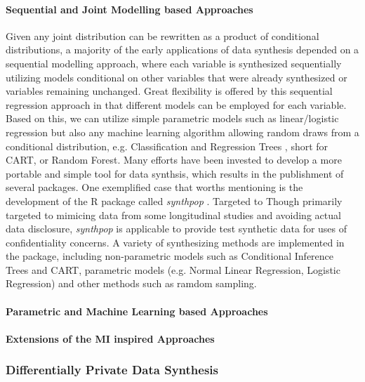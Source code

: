 \paragraph{Sequential and Joint Modelling based Approaches}
Given any joint distribution can be rewritten as a product of conditional distributions, a majority of the early applications of data synthesis depended on a sequential modelling approach, where each 
variable is synthesized sequentially utilizing models conditional on other variables that were already synthesized or variables remaining 
unchanged. Great flexibility is offered by this sequential regression approach in that different models can be employed for each variable.
Based on this, we can utilize simple parametric models such as linear/logistic regression but also any machine learning algorithm allowing random
draws from a conditional distribution, e.g. Classification and Regression Trees \citep{loh2011classification}, short for CART, or Random Forest. Many efforts have been invested to develop a more portable and simple tool for
data synthsis, which results in the publishment of several packages. One exemplified case that worths mentioning is the development of the R package called \textit{synthpop} \citep{nowok2016synthpop}. Targeted to 
Though primarily targeted to mimicing data from some longitudinal studies and avoiding actual data disclosure, \textit{synthpop} is applicable to provide test synthetic data
for uses of confidentiality concerns. A variety of synthesizing methods are implemented in the package, including non-parametric models such as Conditional Inference Trees \citep{hothorn2015ctree} and CART, 
parametric models (e.g. Normal Linear Regression, Logistic Regression) and other methods such as ramdom sampling. 
\paragraph{Parametric and Machine Learning based Approaches}

\paragraph{Extensions of the MI inspired Approaches}


\subsubsection{Differentially Private Data Synthesis}
\label{subsubsec:dpds}



